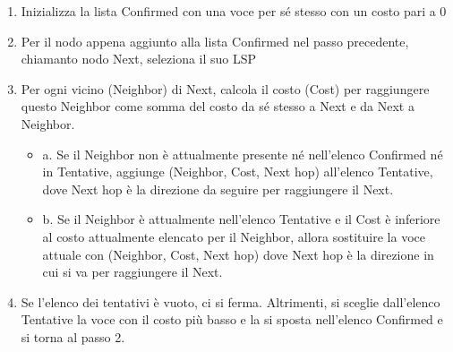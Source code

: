 \begin{enumerate}
  \item Inizializza la lista Confirmed con una voce per sé stesso con un costo pari a 0
  \item Per il nodo appena aggiunto alla lista Confirmed nel passo precedente, chiamanto nodo Next, seleziona il suo LSP
  \item Per ogni vicino (Neighbor) di Next, calcola il costo (Cost) per raggiungere questo Neighbor come somma del costo da sé stesso a Next e da Next a Neighbor.
        \begin{itemize}
          \item a. Se il Neighbor non è attualmente presente né nell’elenco Confirmed né in Tentative, aggiunge (Neighbor, Cost, Next hop) all’elenco Tentative, dove Next hop è la direzione da seguire per raggiungere il Next.
          \item b. Se il Neighbor è attualmente nell’elenco Tentative e il Cost è inferiore al costo attualmente elencato per il Neighbor, allora sostituire la voce attuale con (Neighbor, Cost, Next hop) dove Next hop è la direzione in cui si va per raggiungere il Next.
        \end{itemize}
  \item Se l’elenco dei tentativi è vuoto, ci si ferma. Altrimenti, si sceglie dall’elenco Tentative la voce con il costo più basso e la si sposta nell’elenco Confirmed e si torna al passo 2.
\end{enumerate}
